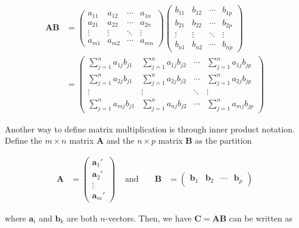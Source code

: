 \documentclass[
]{book}
\theoremstyle{definition}
\theoremstyle{definition}
\theoremstyle{definition}
\theoremstyle{remark}
\begin{document}
\[
\begin{aligned}
\mathbf{A} \mathbf{B} & = \begin{pmatrix} a_{11} & a_{12} & \cdots & a_{1n} \\
a_{21} & a_{22} & \cdots & a_{2n} \\
\vdots & \vdots & \ddots & \vdots \\
a_{m1} & a_{m2} & \cdots & a_{mn}
\end{pmatrix} 
\begin{pmatrix} b_{11} & b_{12} & \cdots & b_{1p} \\
b_{21} & b_{22} & \cdots & b_{2p} \\
\vdots & \vdots & \ddots & \vdots \\
b_{n1} & b_{n2} & \cdots & b_{np}
\end{pmatrix} \\
& = \begin{pmatrix} \sum_{j=1}^n a_{1j} b_{j1} & \sum_{j=1}^n a_{1j} b_{j2} & \cdots & \sum_{j=1}^n a_{1j} b_{jp} \\
\sum_{j=1}^n a_{2j} b_{j1} &\sum_{j=1}^n a_{2j} b_{j2} & \cdots & \sum_{j=1}^n a_{2j} b_{jp} \\
\vdots & \vdots & \ddots & \vdots \\
\sum_{j=1}^n a_{mj} b_{j1} &\sum_{j=1}^n a_{nj} b_{j2} & \cdots & \sum_{j=1}^n a_{mj} b_{jp}
\end{pmatrix} 
\end{aligned}
\label{eq:matrix-multiplication}
\]

Another way to define matrix multiplication is through inner product notation. Define the \(m \times n\) matrix \(\mathbf{A}\) and the \(n \times p\) matrix \(\mathbf{B}\) as the partition

\[
\begin{aligned}
\mathbf{A} & = \begin{pmatrix} \mathbf{a}_{1}' \\
\mathbf{a}_{2}' \\ 
\vdots \\
\mathbf{a}_{m}' \end{pmatrix}
& \mbox{ and } 
&& \mathbf{B} & = \begin{pmatrix} \mathbf{b}_{1} & \mathbf{b}_{2} & \cdots & \mathbf{b}_{p} \end{pmatrix} 
\end{aligned}
\]

where \(\mathbf{a}_i\) and \(\mathbf{b}_k\) are both \(n\)-vectors. Then, we have \(\mathbf{C} = \mathbf{A} \mathbf{B}\) can be written as
\end{document}
